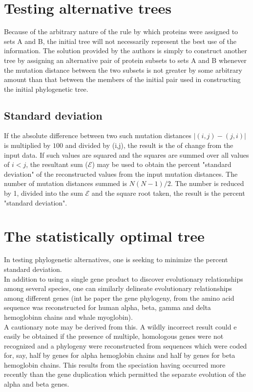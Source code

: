 \section{Testing alternative trees}
Because of the arbitrary nature of the rule by which proteins were assigned to sets A and B, the initial tree will not necessarily represent the best use of the information. The solution provided by the authors is simply to construct another tree by assigning an alternative pair of protein subsets to sets A and B whenever the mutation distance between the two subsets is not greater by some arbitrary amount than that between the members of the initial pair used in constructing the initial phylogenetic tree. 

\subsection{Standard deviation}
If the absolute difference between two such mutation distances $|(i,j)-(j,i)|$ is multiplied by $100$ and divided by (i,j), the result is the  of change from the input data. If such values are squared and the squares are summed over all values of $i < j$, the resultant sum ($\mathcal{E}$) may be used to obtain the percent "standard deviation" of the reconstructed values from the input mutation distances. The number of mutation distances summed is $N(N-1)/2$. The number is reduced by 1, divided into the sum $\mathcal{E}$ and the square root taken, the result is the percent "standard deviation". 

\section{The statistically optimal tree}
In testing phylogenetic alternatives, one is seeking to minimize the percent standard deviation.
\\
In addition to using a single gene product to discover evolutionary relationships among several species, one can similarly delineate evolutionary relationships among different genes (int he paper the gene phylogeny, from the amino acid sequence was reconstructed for human alpha, beta, gamma and delta hemoglobinn chains and whale myoglobin).
\\
A cautionary note may be derived from this. A wildly incorrect result could e easily be obtained if the presence of multiple, homologous genes were not recognized and a phylogeny were reconstructed from sequences which were coded for, say, half by genes for alpha hemoglobin chains and half by genes for beta hemoglobin chains. This results from the speciation having occurred more recently than the gene duplication which permitted the separate evolution of the alpha and beta genes.


